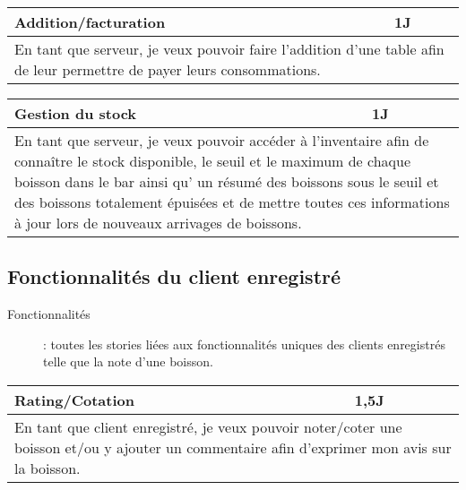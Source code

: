 \begin{center}
	\vspace{1cm}
	
	\begin{tabular}{ll}
		\hline
			\multicolumn{1}{|p{14cm}|}{Addition/facturation} & \multicolumn{1}{p{0.7cm}|}{1J} \\ 
		\hline
			\multicolumn{2}{|p{15cm}|}{En tant que serveur, je veux pouvoir faire l'addition 
			d'une table afin de leur permettre de payer leurs consommations.} \\
		\hline
	\end{tabular}

	\vspace{1cm}
	
	\begin{tabular}{ll}
		\hline
			\multicolumn{1}{|p{14cm}|}{Gestion du stock} & \multicolumn{1}{p{0.7cm}|}{1J}\\ 
		\hline
			\multicolumn{2}{|p{15cm}|}{En tant que serveur, je veux pouvoir accéder à l'inventaire
			afin de connaître le stock disponible, le seuil et le maximum de chaque boisson dans
			le bar ainsi qu' un résumé des boissons sous le seuil et des boissons totalement
			épuisées et de mettre toutes ces informations à jour lors de nouveaux arrivages de boissons.} \\
		\hline
	\end{tabular}
\end{center}

\subsection{Fonctionnalités du client enregistré}
\begin{description}
	\item[Fonctionnalités] : toutes les stories liées aux fonctionnalités uniques des clients enregistrés telle que la note d'une boisson.
\end{description}

\begin{center}
	\begin{tabular}{ll}
		\hline
			\multicolumn{1}{|p{14cm}|}{Rating/Cotation} & \multicolumn{1}{p{0.7cm}|}{1,5J} \\ 
		\hline
			\multicolumn{2}{|p{15cm}|}{En tant que client enregistré, je veux pouvoir
			noter/coter une boisson et/ou y ajouter un commentaire afin d'exprimer mon avis sur la boisson.} \\
		\hline
	\end{tabular}
\end{center}

